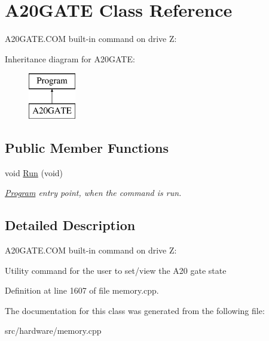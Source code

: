 \hypertarget{classA20GATE}{\section{A20\-G\-A\-T\-E Class Reference}
\label{classA20GATE}
}


A20\-G\-A\-T\-E.\-C\-O\-M built-\/in command on drive Z\-:  


Inheritance diagram for A20\-G\-A\-T\-E\-:\begin{figure}[H]
\begin{center}
\leavevmode
\includegraphics[height=2.000000cm]{classA20GATE}
\end{center}
\end{figure}
\subsection*{Public Member Functions}
\begin{DoxyCompactItemize}
\item 
\hypertarget{classA20GATE_a7d53ddb7d6453f710b7e829b5c0f6ca3}{void \hyperlink{classA20GATE_a7d53ddb7d6453f710b7e829b5c0f6ca3}{Run} (void)}\label{classA20GATE_a7d53ddb7d6453f710b7e829b5c0f6ca3}

\begin{DoxyCompactList}\small\item\em \hyperlink{classProgram}{Program} entry point, when the command is run. \end{DoxyCompactList}\end{DoxyCompactItemize}


\subsection{Detailed Description}
A20\-G\-A\-T\-E.\-C\-O\-M built-\/in command on drive Z\-: 

Utility command for the user to set/view the A20 gate state 

Definition at line 1607 of file memory.\-cpp.



The documentation for this class was generated from the following file\-:\begin{DoxyCompactItemize}
\item 
src/hardware/memory.\-cpp\end{DoxyCompactItemize}
